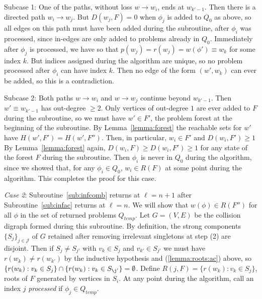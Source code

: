 \documentclass[11pt,reqno]{amsart}
\theoremstyle{definition}
\numberwithin{equation}{section}
\newcommand{\pre}{\phi}
\newcommand{\strongcomp}{S}
\newcommand{\acto}{Q_0}
\newcommand{\actt}{Q_{temp}}
\newcommand{\reach}{H}
\newcommand{\forest}{F}
\newcommand{\roott}{R}
\newcommand{\depth}{D}
\newcommand{\infcombgraphii}{(2)\xspace}
\begin{document}
Subcase 1: One of the paths, without loss $w \to w_i$, ends at $w_{k'-1}$. 
Then there is a directed path $w_i \to w_j$.
But $\depth(w_j, \forest) = 0$ when $\pre_j$ is added to $\acto$ as above, so all edges on this path must have been added during the subroutine, after $\pre_i$ was processed, since in-edges are only added to problems already in $\acto$.
Immediately after $\pre_j$ is processed, we have so that $p(w_j) = r(w_j) = w(\pre') \equiv w_k$ for some index $k$.
But indices assigned during the algorithm are unique, so no problem processed after $\pre_i$ can have index $k$.
Then no edge of the form $(w',w_k)$ can ever be added, so this is a contradiction.

Subcase 2: Both paths $w \to w_i$ and $w \to w_j$ continue beyond $w_{k'-1}$.
Then $w' \equiv w_{k' - 1}$ has out-degree $\geq 2$.
Only vertices of out-degree $1$ are ever added to $\forest$ during the subroutine, so we must have $w' \in \forest'$, the problem forest at the beginning of the subroutine.
By Lemma~\ref{lemma:forest} the reachable sets for $w'$ have $\reach(w',\forest') = \reach(w',\forest'')$.  
Then, in particular, $w_i \in \forest'$ and $\depth(w_i, \forest') \geq 1$
By Lemma~\ref{lemma:forest} again, $\depth(w_i, \forest) \geq \depth(w_i, \forest') \geq 1$  for any state of the forest $\forest$ during the subroutine. 
Then $\pre_i$ is never in $\acto$ during the algorithm, since we showed that, for any $\pre_i \in \acto$, $w_i \in \roott(\forest)$ at some point during the algorithm. 
This completes the proof for this case.

\emph{Case 2}: Subroutine~\ref{sub:infcomb} returns at $\ell = n +1$ after Subroutine~\ref{sub:infac} returns at $\ell = n$. 
We will show that $w(\pre) \in \roott(\forest'')$ for all $\pre$ in the set of returned problems $\actt$.
Let $G = (V,E)$ be the collision digraph formed during this subroutine.
By definition, the strong components $\{\strongcomp_j\}_{j \in \mathcal{J}}$ of $G$ retained after removing irrelevant singletons at step \infcombgraphii are disjoint. 
Then if $\strongcomp_j \not = \strongcomp_{j'}$ with $v_k \in \strongcomp_j$ and $v_{k'} \in \strongcomp_{j'}$ we must have $r(w_k) \not = r(w_{k'})$ by the inductive hypothesis and (\ref{lemma:roots:ac}) above, so $\{r(w_k): v_k \in \strongcomp_j\} \cap \{r(w_k): v_k \in \strongcomp_{\j'}\} = \emptyset$. 
Define $R(j,\forest) = \{r(w_k): v_k \in \strongcomp_j\}$, roots of $\forest$ generated by vertices in $\strongcomp_i$. 
At any point during the algorithm, call an index $j$ \emph{processed} if $\pre_j \in \actt$.
\end{document}
